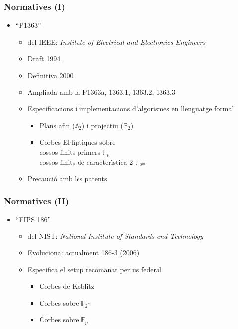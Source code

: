 \documentclass{beamer}
\def\lgem{l\ensuremath{\cdot}l}
\def\CEs{Corbes E\lgem{}\'{\i}ptiques}%
\def\cfs{cossos finits}%
\newcommand{\A}{\ensuremath{\mathbb{A}_{2}}}%
\newcommand{\Proy}{\ensuremath{\mathbb{P}_{2}}}%
\newcommand{\Fp}{\ensuremath{\mathbb{F}_p}}%
\newcommand{\Fm}{\ensuremath{\mathbb{F}_{2^m}}}%
\theoremstyle{saltolinea}   			%
\begin{document}
\begin{frame}
  \frametitle{Normatives (I)}
  \begin{itemize}
    \item<2-> ``P1363''
    \begin{itemize}
      \item<3-> del IEEE: \emph{Institute of Electrical and Electronics Engineers}
      \item<4-> Draft 1994
      \item<5-> Definitiva 2000
      \item<6-> Ampliada amb la P1363a, 1363.1, 1363.2, 1363.3
      \item<7-> Especificacions i implementacions d'algorismes en llenguatge formal
      \begin{itemize}
        \item<8-> Plans afin (\A) i projectiu (\Proy)
        \item<9-> \CEs{} sobre \\
          \cfs{} primers \Fp \\
          \cfs{} de caracter\'{\i}stica 2 \Fm
      \end{itemize}
      \item<10-> Precauci\'o amb les patents
    \end{itemize}
  \end{itemize}
\end{frame}

\begin{frame}
  \frametitle{Normatives (II)}
  \begin{itemize}
    \item<1-> ``FIPS 186''
    \begin{itemize}
      \item<2-> del NIST: \emph{National Institute of Standards and Technology}
      \item<3-> Evoluciona: actualment 186-3 (2006)
      \item<4-> Especifica el setup recomanat per us federal
      \begin{itemize}
        \item<5-> Corbes de Koblitz
        \item<6-> Corbes sobre \Fm
        \item<7-> Corbes sobre \Fp
      \end{itemize}
    \end{itemize}
  \end{itemize}
\end{frame}
\end{document}
